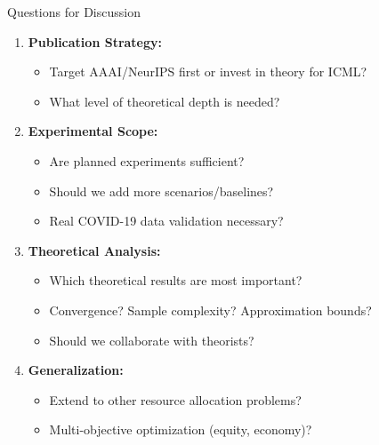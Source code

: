 \documentclass[aspectratio=169]{beamer}
\begin{document}
\begin{frame}{Questions for Discussion}

\begin{enumerate}
    \item \textbf{Publication Strategy:}
    \begin{itemize}
        \item Target AAAI/NeurIPS first or invest in theory for ICML?
        \item What level of theoretical depth is needed?
    \end{itemize}

    \item \textbf{Experimental Scope:}
    \begin{itemize}
        \item Are planned experiments sufficient?
        \item Should we add more scenarios/baselines?
        \item Real COVID-19 data validation necessary?
    \end{itemize}

    \item \textbf{Theoretical Analysis:}
    \begin{itemize}
        \item Which theoretical results are most important?
        \item Convergence? Sample complexity? Approximation bounds?
        \item Should we collaborate with theorists?
    \end{itemize}

    \item \textbf{Generalization:}
    \begin{itemize}
        \item Extend to other resource allocation problems?
        \item Multi-objective optimization (equity, economy)?
    \end{itemize}
\end{enumerate}

\end{frame}
\end{document}
